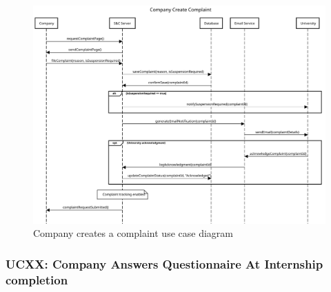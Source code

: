 \begin{figure}[H]
    \centering
    \includegraphics[width=1.0\textwidth]{Images/UC_13.pdf}
    \caption{Company creates a complaint use case diagram}
    \label{fig:use-case-diagram-13}
\end{figure}


\subsubsection{UCXX: Company Answers Questionnaire At Internship completion}
\label{subsubsec:company-answers-questionnaire-at-internship-completion}

